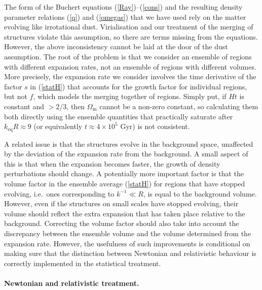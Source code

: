 \documentclass[11pt, a4paper]{article}
\newcommand{\re}[1]{(\ref{#1})}
\newcommand{\para}{\paragraph}
\newcommand{\keq}{k_{\mathrm{eq}}}
\newcommand{\ie}{i.e.\ }
\newcommand{\Om}{\Omega_{\mathrm{m}}}
\begin{document}
The form of the Buchert equations \re{Ray}--\re{cons} and the resulting density parameter relations \re{q} and \re{omegas} that we have used rely on the matter evolving like irrotational dust. Virialisation and our treatment of the merging of structures violate this assumption, so there are terms missing from the equations. However, the above inconsistency cannot be laid at the door of the dust assumption.
The root of the problem is that we consider an ensemble of regions with different expansion rates, not an ensemble of regions with different volumes. More precisely, the expansion rate we consider involves the time derivative of the factor $s$ in \re{statH} that accounts for the growth factor for individual regions, but not $f$, which models the merging together of regions.
Simply put, if $Ht$ is constant and $>2/3$, then $\Om$ cannot be a non-zero constant, so calculating them both directly using the ensemble quantities that practically saturate after $\keq R\approx9$ (or equivalently $t\approx 4\times10^{5}$ Gyr) is not consistent.

A related issue is that the structures evolve in the background space, unaffected by the deviation of the expansion rate from the background. A small aspect of this is that when the expansion becomes faster, the growth of density perturbations should change. A potentially more important factor is that the volume factor in the ensemble average \re{statH} for regions that have stopped evolving, \ie ones corresponding to $k^{-1}\ll R$, is equal to the background volume. However, even if the structures on small scales have stopped evolving, their volume should reflect the extra expansion that has taken place relative to the background. Correcting the volume factor should also take into account the discrepancy between the ensemble volume and the volume determined from the expansion rate.
However, the usefulness of such improvements is conditional on making sure that the distinction between Newtonian and relativistic behaviour is correctly implemented in the statistical treatment.

\para{Newtonian and relativistic treatment.}
\end{document}

